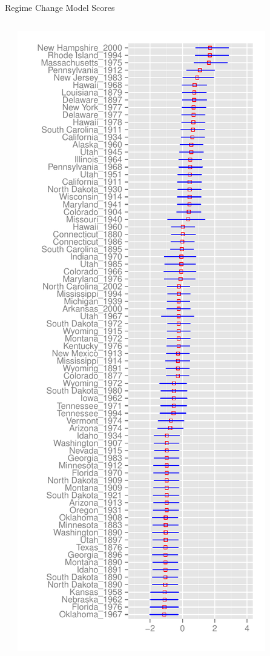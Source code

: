 \documentclass{beamer}              %
\makeatletter
\newcounter{acolumn}%
\let\column\@acolumn
\let\column\@@acolumn
\makeatother
\begin{document}
\begin{frame}{Regime Change Model Scores}
\begin{columns}[c]
\begin{center}
		\end{center}
		\column{1.5in}
		\begin{center}
			\includegraphics[scale=.3]{graphics/regime/regime_param_mean_second_ggplot}
		\end{center}
	\end{columns}
\end{frame}
\end{document}
